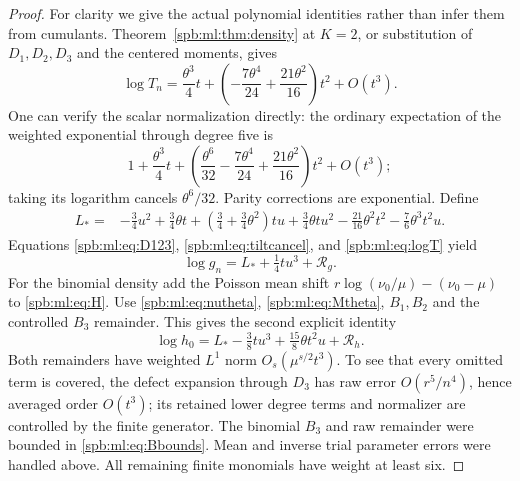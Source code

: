 \begin{proof}
For clarity we give the actual polynomial identities rather than infer them from cumulants. Theorem~\ref{spb:ml:thm:density} at $K=2$, or substitution of $D_1,D_2,D_3$ and the centered moments, gives
\begin{equation}\label{spb:ml:eq:logT}
 \log T_n=\frac{\theta^3}{4}t+
                \left(-\frac{7\theta^4}{24}+\frac{21\theta^2}{16}\right)t^2+O(t^3).
\end{equation}
One can verify the scalar normalization directly: the ordinary expectation of the weighted exponential through degree five is
\[
 1+\frac{\theta^3}{4}t+
 \left(\frac{\theta^6}{32}-\frac{7\theta^4}{24}
                +\frac{21\theta^2}{16}\right)t^2+O(t^3);
\]
taking its logarithm cancels $\theta^6/32$. Parity corrections are exponential. Define
\begin{align}
 L_*={}&-\tfrac34u^2+\tfrac34\theta t
 +(\tfrac34+\tfrac34\theta^2)tu+\tfrac34\theta tu^2
 -\tfrac{21}{16}\theta^2t^2-\tfrac76\theta^3t^2u.\label{spb:ml:eq:Lstar}
\end{align}
Equations \eqref{spb:ml:eq:D123}, \eqref{spb:ml:eq:tiltcancel}, and \eqref{spb:ml:eq:logT} yield
\begin{equation}\label{spb:ml:eq:logg}
 \log g_n=L_*+\tfrac14tu^3+\mathcal R_g.
\end{equation}
For the binomial density add the Poisson mean shift
$r\log(\nu_0/\mu)-(\nu_0-\mu)$ to \eqref{spb:ml:eq:H}. Use \eqref{spb:ml:eq:nutheta}, \eqref{spb:ml:eq:Mtheta}, $B_1,B_2$ and the controlled $B_3$ remainder. This gives the second explicit identity
\begin{equation}\label{spb:ml:eq:logh}
 \log h_0=L_*-\tfrac38tu^3+\tfrac{15}{8}\theta t^2u+\mathcal R_h.
\end{equation}
Both remainders have weighted $L^1$ norm $O_s(\mu^{s/2}t^3)$. To see that every omitted term is covered, the defect expansion through $D_3$ has raw error $O(r^5/n^4)$, hence averaged order $O(t^3)$; its retained lower degree terms and normalizer are controlled by the finite generator. The binomial $B_3$ and raw remainder were bounded in \eqref{spb:ml:eq:Bbounds}. Mean and inverse trial parameter errors were handled above. All remaining finite monomials have weight at least six.


\end{proof}

